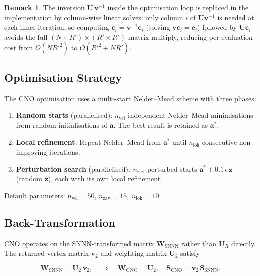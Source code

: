 \documentclass[11pt]{article}
\theoremstyle{definition}
\newtheorem{remark}{Remark}[section]
\theoremstyle{plain}
\newcommand{\mat}[1]{\mathbf{#1}}
\begin{document}
\begin{remark}
The inversion $\mat{U}\,\mat{v}^{-1}$ inside the optimisation loop is
replaced in the implementation by column-wise linear solves:
only column $i$ of $\mat{U}\mat{v}^{-1}$ is needed at each inner
iteration, so computing
$\mat{c}_i = \mat{v}^{-1}\mat{e}_i$ (solving $\mat{v}\mat{c}_i = \mat{e}_i$)
followed by $\mat{U}\mat{c}_i$ avoids the full $(N\times R')\times(R'\times R')$
matrix multiply, reducing per-evaluation cost from $O(NR'^2)$ to $O(R'^2 + NR')$.
\end{remark}

\subsection{Optimisation Strategy}

The CNO optimisation uses a multi-start Nelder--Mead scheme with three phases:

\begin{enumerate}
  \item \textbf{Random starts} (parallelised): $n_{\mathrm{vel}}$ independent
        Nelder--Mead minimisations from random initialisations of $\mat{a}$.
        The best result is retained as $\mat{a}^*$.
  \item \textbf{Local refinement}: Repeat Nelder--Mead from $\mat{a}^*$ until
        $n_{\mathrm{lok}}$ consecutive non-improving iterations.
  \item \textbf{Perturbation search} (parallelised): $n_{\mathrm{zav}}$ perturbed
        starts $\mat{a}^* + 0.1\,\epsilon\,\mat{z}$ (random $\mat{z}$),
        each with its own local refinement.
\end{enumerate}

Default parameters: $n_{\mathrm{vel}} = 50$, $n_{\mathrm{zav}} = 15$,
$n_{\mathrm{lok}} = 10$.

\subsection{Back-Transformation}

CNO operates on the SNNN-transformed matrix $\mat{W}_{\mathrm{SNNN}}$
rather than $\mat{U}_R$ directly.  The returned vertex matrix $\mat{v}_2$
and weighting matrix $\mat{U}_2$ satisfy

\begin{equation}
  \mat{W}_{\mathrm{SNNN}} = \mat{U}_2\,\mat{v}_2,
  \quad \Rightarrow \quad
  \mat{W}_{\mathrm{CNO}} = \mat{U}_2,
  \quad
  \mat{S}_{\mathrm{CNO}} = \mat{v}_2\,\mat{S}_{\mathrm{SNNN}}.
  \label{eq:cno_chain}
\end{equation}
\end{document}
